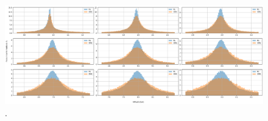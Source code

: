 


\begin{figure}[ht]
\centering
\includegraphics[width=1\textwidth]{Simulacion/imagenes/Datos_Photon4muon_ALL.png}
\caption{.}
\label{genera_darksusy}
\end{figure}




